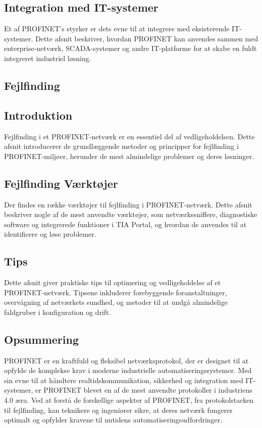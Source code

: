 \subsection*{Integration med IT-systemer}
Et af PROFINET's styrker er dets evne til at integrere med eksisterende IT-systemer. Dette afsnit beskriver, hvordan PROFINET kan anvendes sammen med enterprise-netværk, SCADA-systemer og andre IT-platforme for at skabe en fuldt integreret industriel løsning.

\subsection{Fejlfinding}
\subsection*{Introduktion}
Fejlfinding i et PROFINET-netværk er en essentiel del af vedligeholdelsen. Dette afsnit introducerer de grundlæggende metoder og principper for fejlfinding i PROFINET-miljøer, herunder de mest almindelige problemer og deres løsninger.

\subsection*{Fejlfinding Værktøjer}
Der findes en række værktøjer til fejlfinding i PROFINET-netværk. Dette afsnit beskriver nogle af de mest anvendte værktøjer, som netværkssniffere, diagnostiske software og integrerede funktioner i TIA Portal, og hvordan de anvendes til at identificere og løse problemer.

\subsection*{Tips}
Dette afsnit giver praktiske tips til optimering og vedligeholdelse af et PROFINET-netværk. Tipsene inkluderer forebyggende foranstaltninger, overvågning af netværkets sundhed, og metoder til at undgå almindelige faldgruber i konfiguration og drift.

\subsection{Opsummering}
PROFINET er en kraftfuld og fleksibel netværksprotokol, der er designet til at opfylde de komplekse krav i moderne industrielle automatiseringssystemer. Med sin evne til at håndtere realtidskommunikation, sikkerhed og integration med IT-systemer, er PROFINET blevet en af de mest anvendte protokoller i industriens 4.0 æra. Ved at forstå de forskellige aspekter af PROFINET, fra protokolstacken til fejlfinding, kan teknikere og ingeniører sikre, at deres netværk fungerer optimalt og opfylder kravene til nutidens automatiseringsudfordringer.

